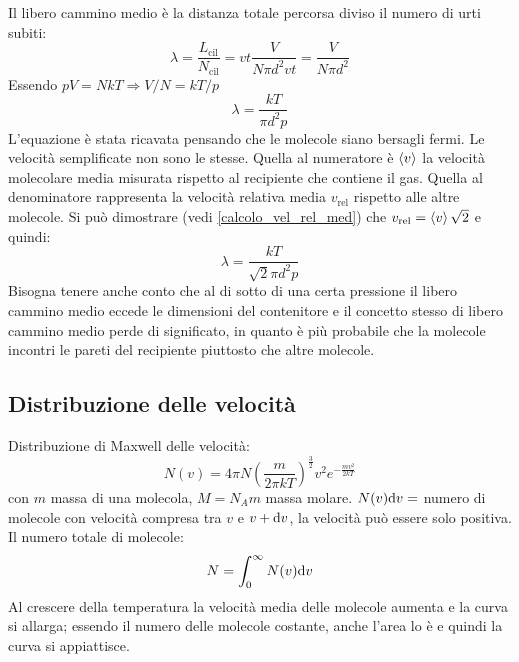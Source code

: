Il libero cammino medio è la distanza totale percorsa diviso il numero di urti subiti:
\[\lambda=\frac{L_{\text{cil}}}{N_{\text{cil}}}=vt\frac{V}{N\pi d^2vt}=\frac{V}{N\pi d^2}\]
Essendo $pV=NkT \Rightarrow V/N=kT/p$
\[\lambda=\frac{kT}{\pi d^2 p}\]
L'equazione è stata ricavata pensando che le molecole siano bersagli fermi. Le velocità semplificate non sono le stesse. Quella al numeratore è $\left<v\right>$ la velocità molecolare media misurata rispetto al recipiente che contiene il gas. Quella al denominatore rappresenta la velocità relativa media $v_\text{rel}$ rispetto alle altre molecole. Si può dimostrare (vedi \ref{calcolo_vel_rel_med}) che $v_\text{rel}=\left<v\right>\sqrt{2}$ e quindi:
\[\lambda=\frac{kT}{\sqrt{2}\pi d^2p}\]
Bisogna tenere anche conto che al di sotto di una certa pressione il libero cammino medio eccede le dimensioni del contenitore e il concetto stesso di libero cammino  medio perde di significato, in quanto è più probabile che la molecole incontri le pareti del recipiente piuttosto che altre molecole.

\subsection{Distribuzione delle velocità}
Distribuzione di Maxwell delle velocità:
\begin{equation}
   N(v)=4\pi N\left(\frac{m}{2\pi kT}\right)^{\frac{3}{2}}v^2e^{-\frac{mv^2}{2kT}}
\end{equation}
con $m$ massa di una molecola, $M=N_Am$ massa molare.
$N(v)\mathrm{d} v=$ numero di molecole con velocità compresa tra $v$ e $v+\mathrm{d} v$, la velocità può essere solo positiva. Il numero totale di molecole:
\begin{equation}
   N=\int_0^\infty N(v)\mathrm{d} v
\end{equation}
Al crescere della temperatura la velocità media delle molecole aumenta e la curva si allarga; essendo il numero delle molecole costante, anche l'area lo è e quindi la curva si appiattisce.

